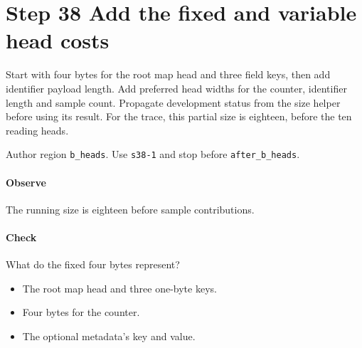 \section{Step 38 Add the fixed and variable head costs}\label{cbor-s38}
Start with four bytes for the root map head and three field keys, then add identifier payload length. Add preferred head widths for the counter, identifier length and sample count. Propagate development status from the size helper before using its result. For the trace, this partial size is eighteen, before the ten reading heads.

Author region \texttt{b\_heads}. Use \texttt{s38-1} and stop before \texttt{after\_b\_heads}.

\paragraph{Observe} The running size is eighteen before sample contributions.

\paragraph{Check} What do the fixed four bytes represent?
\begin{itemize}
  \item[A.] The root map head and three one-byte keys.
  \item[B.] Four bytes for the counter.
  \item[C.] The optional metadata's key and value.
\end{itemize}

